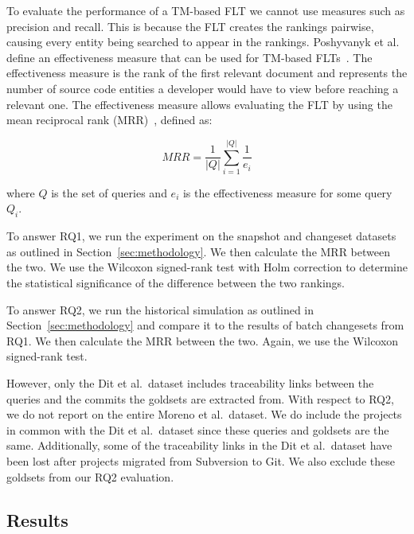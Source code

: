 To evaluate the performance of a TM-based FLT we cannot use
measures such as precision and recall. This is because the FLT creates
the rankings pairwise, causing every entity being searched to appear in the rankings.
Poshyvanyk et al. define an effectiveness measure that can be used for TM-based FLTs~\cite{Poshyvanyk-etal:2007}.
The effectiveness measure is the rank of the first relevant document
and represents the number of source code entities a developer would have to view before reaching a relevant one.
The effectiveness measure allows evaluating the FLT by using
the mean reciprocal rank (MRR)~\cite{Voorhees:1999}, defined as:

\begin{equation}
    MRR = \frac{1}{|Q|} \sum_{i=1}^{|Q|} \frac{1}{e_i}
\end{equation}

where $Q$ is the set of queries
and $e_i$ is the effectiveness measure for some query $Q_i$.

To answer RQ1, we run the experiment on the snapshot and changeset
datasets as outlined in Section~\ref{sec:methodology}.
We then calculate the MRR between the two.
We use the Wilcoxon signed-rank test with Holm correction to determine
the statistical significance of the difference between the two rankings.

To answer RQ2, we run the historical simulation as outlined in Section~\ref{sec:methodology}
and compare it to the results of batch changesets from RQ1.
We then calculate the MRR between the two.
Again, we use the Wilcoxon signed-rank test.

However, only the Dit et al.\ dataset includes traceability links between
the queries and the commits the goldsets are extracted from.
With respect to RQ2, we do not report on the entire Moreno et al.\ dataset.
We do include the projects in common with the Dit et al.\ dataset
since these queries and goldsets are the same.
Additionally, some of the traceability links in the Dit et al.\ dataset
have been lost after projects migrated from Subversion to Git.
We also exclude these goldsets from our RQ2 evaluation.



\subsection{Results}




